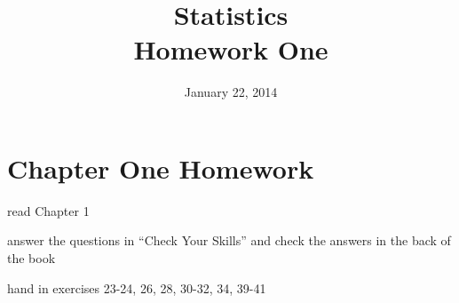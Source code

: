 \documentclass{exam}
\author{}
\date{January 22, 2014}
\title{Statistics \\ Homework One}
\begin{document}
  \maketitle
  \section{Chapter One Homework}

  \begin{itemize*}
    \item read Chapter 1 
    \item answer the questions in ``Check Your Skills'' and check the answers in the back of the book
    \item hand in exercises 23-24, 26, 28, 30-32, 34, 39-41
  \end{itemize*}

  \ifprintanswers
\end{document}
